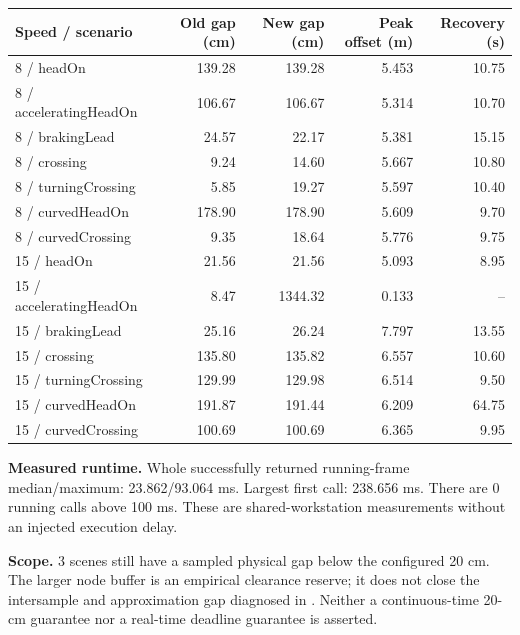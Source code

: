 \documentclass[10pt]{article}
\begin{document}
\begin{center}
\begin{tabular}{lrrrr}
\toprule
Speed / scenario & Old gap (cm) & New gap (cm) & Peak offset (m) & Recovery (s) \\
\midrule
8 / headOn & 139.28 & 139.28 & 5.453 & 10.75 \\
8 / acceleratingHeadOn & 106.67 & 106.67 & 5.314 & 10.70 \\
8 / brakingLead & 24.57 & 22.17 & 5.381 & 15.15 \\
8 / crossing & 9.24 & 14.60 & 5.667 & 10.80 \\
8 / turningCrossing & 5.85 & 19.27 & 5.597 & 10.40 \\
8 / curvedHeadOn & 178.90 & 178.90 & 5.609 & 9.70 \\
8 / curvedCrossing & 9.35 & 18.64 & 5.776 & 9.75 \\
15 / headOn & 21.56 & 21.56 & 5.093 & 8.95 \\
15 / acceleratingHeadOn & 8.47 & 1344.32 & 0.133 & -- \\
15 / brakingLead & 25.16 & 26.24 & 7.797 & 13.55 \\
15 / crossing & 135.80 & 135.82 & 6.557 & 10.60 \\
15 / turningCrossing & 129.99 & 129.98 & 6.514 & 9.50 \\
15 / curvedHeadOn & 191.87 & 191.44 & 6.209 & 64.75 \\
15 / curvedCrossing & 100.69 & 100.69 & 6.365 & 9.95 \\
\bottomrule
\end{tabular}
\end{center}
\textbf{Measured runtime.} Whole successfully returned running-frame median/maximum: 23.862/93.064 ms. Largest first call: 238.656 ms. There are 0 running calls above 100 ms. These are shared-workstation measurements without an injected execution delay.

\textbf{Scope.} 3 scenes still have a sampled physical gap below the configured 20 cm. The larger node buffer is an empirical clearance reserve; it does not close the intersample and approximation gap diagnosed in . Neither a continuous-time 20-cm guarantee nor a real-time deadline guarantee is asserted.
\end{document}
